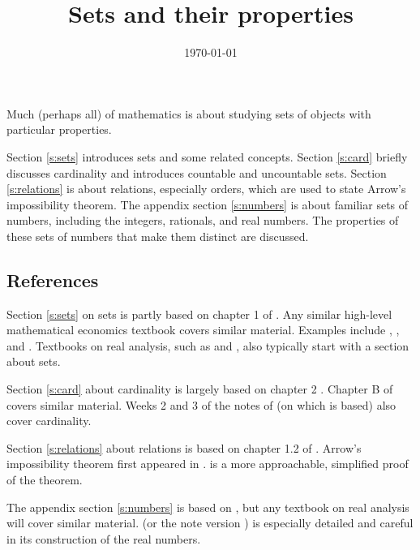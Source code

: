  

\title{Sets and their properties}
\date{\today}



\maketitle

Much (perhaps all) of mathematics is about studying sets of objects
with particular properties. 

Section \ref{s:sets} introduces sets and some related concepts.
Section \ref{s:card} briefly discusses cardinality and introduces
countable and uncountable sets. Section \ref{s:relations} is about
relations, especially orders, which are used to state Arrow's
impossibility theorem. The appendix section \ref{s:numbers} is about
familiar sets of numbers, including the integers, rationals, and real
numbers. The properties of these sets of numbers that make them
distinct are discussed.

\subsection*{References}

Section \ref{s:sets} on sets is partly based on chapter 1 of
\cite{carter2001}. Any similar high-level mathematical economics
textbook covers similar material. Examples include \cite{fuente2000},
\cite{ok2007}, and \cite{corbae2009}. Textbooks on real analysis, such
as \cite{rudin1976} and \cite{tao2006}, also typically start with a
section about sets.

Section \ref{s:card} about cardinality is largely based on chapter 2
\citet{rudin1976}. Chapter B of \cite{ok2007} covers similar
material. Weeks 2 and 3 of the notes of \cite{tao2003} (on which
\cite{tao2006} is based) also cover cardinality.

Section \ref{s:relations} about relations is based on chapter 1.2 of
\cite{carter2001}. Arrow's impossibility theorem first appeared in
\cite{arrow1950}. \cite{feldman1974} is a more approachable, simplified
proof of the theorem.

The appendix section \ref{s:numbers} is based on \cite{rudin1976}, but
any textbook on real analysis will cover similar
material. \cite{tao2006} (or the note version \cite{tao2003}) is
especially detailed and careful in its construction of the real
numbers. 


